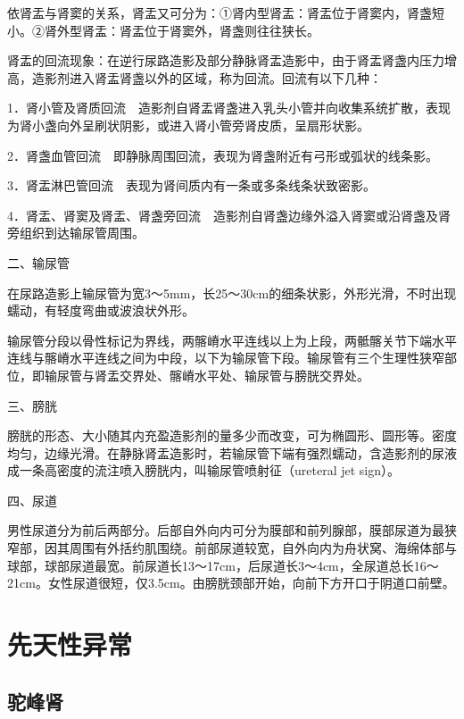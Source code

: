 依肾盂与肾窦的关系，肾盂又可分为：①肾内型肾盂：肾盂位于肾窦内，肾盏短小。②肾外型肾盂：肾盂位于肾窦外，肾盏则往往狭长。

肾盂的回流现象：在逆行尿路造影及部分静脉肾盂造影中，由于肾盂肾盏内压力增高，造影剂进入肾盂肾盏以外的区域，称为回流。回流有以下几种：

1．肾小管及肾质回流　造影剂自肾盂肾盏进入乳头小管并向收集系统扩散，表现为肾小盏向外呈刷状阴影，或进入肾小管旁肾皮质，呈扇形状影。

2．肾盏血管回流　即静脉周围回流，表现为肾盏附近有弓形或弧状的线条影。

3．肾盂淋巴管回流　表现为肾间质内有一条或多条线条状致密影。

4．肾盂、肾窦及肾盂、肾盏旁回流　造影剂自肾盏边缘外溢入肾窦或沿肾盏及肾旁组织到达输尿管周围。

二、输尿管

在尿路造影上输尿管为宽3～5mm，长25～30cm的细条状影，外形光滑，不时出现蠕动，有轻度弯曲或波浪状外形。

输尿管分段以骨性标记为界线，两髂嵴水平连线以上为上段，两骶髂关节下端水平连线与髂嵴水平连线之间为中段，以下为输尿管下段。输尿管有三个生理性狭窄部位，即输尿管与肾盂交界处、髂嵴水平处、输尿管与膀胱交界处。

三、膀胱

膀胱的形态、大小随其内充盈造影剂的量多少而改变，可为椭圆形、圆形等。密度均匀，边缘光滑。在静脉肾盂造影时，若输尿管下端有强烈蠕动，含造影剂的尿液成一条高密度的流注喷入膀胱内，叫输尿管喷射征（ureteral
jet sign）。

四、尿道

男性尿道分为前后两部分。后部自外向内可分为膜部和前列腺部，膜部尿道为最狭窄部，因其周围有外括约肌围绕。前部尿道较宽，自外向内为舟状窝、海绵体部与球部，球部尿道最宽。前尿道长13～17cm，后尿道长3～4cm，全尿道总长16～21cm。女性尿道很短，仅3.5cm。由膀胱颈部开始，向前下方开口于阴道口前壁。

\section{先天性异常}

\subsection{驼峰肾}

\begin{figure}
    \centering
    \\
    \caption{}
    \label{fig6-2-1}
\end{figure}



